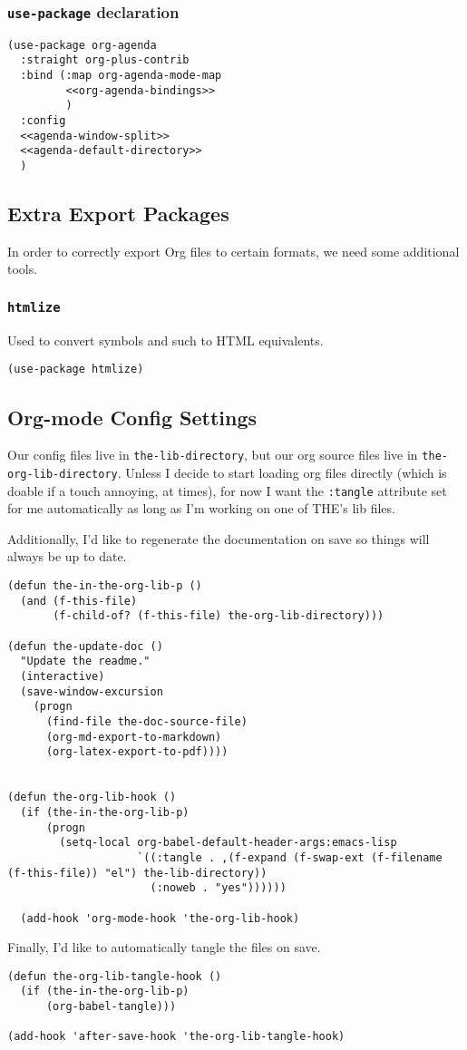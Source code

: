 \documentclass[11pt]{article}
\begin{document}
\subsubsection{\texttt{use-package} declaration}
\label{sec:org788b1d5}
\begin{verbatim}
(use-package org-agenda
  :straight org-plus-contrib
  :bind (:map org-agenda-mode-map
         <<org-agenda-bindings>>
         )
  :config
  <<agenda-window-split>>
  <<agenda-default-directory>>
  )
\end{verbatim}

\subsection{Extra Export Packages}
\label{sec:org6cfff20}
In order to correctly export Org files to certain formats, we need
some additional tools.
\subsubsection{\texttt{htmlize}}
\label{sec:orga1bc077}
Used to convert symbols and such to HTML equivalents.
\begin{verbatim}
(use-package htmlize)
\end{verbatim}
\subsection{Org-mode Config Settings}
\label{sec:org5c41c3e}
Our config files live in \texttt{the-lib-directory}, but our org source files
live in \texttt{the-org-lib-directory}. Unless I decide to start loading org
files directly (which is doable if a touch annoying, at times), for
now I want the \texttt{:tangle} attribute set for me automatically as long as
I'm working on one of THE's lib files.

Additionally, I'd like to regenerate the documentation on save so
things will always be up to date.

\begin{verbatim}
(defun the-in-the-org-lib-p ()
  (and (f-this-file)
       (f-child-of? (f-this-file) the-org-lib-directory)))

(defun the-update-doc ()
  "Update the readme."
  (interactive)
  (save-window-excursion
    (progn
      (find-file the-doc-source-file)
      (org-md-export-to-markdown)
      (org-latex-export-to-pdf))))


(defun the-org-lib-hook ()
  (if (the-in-the-org-lib-p)
      (progn
        (setq-local org-babel-default-header-args:emacs-lisp
                    `((:tangle . ,(f-expand (f-swap-ext (f-filename (f-this-file)) "el") the-lib-directory))
                      (:noweb . "yes"))))))

  (add-hook 'org-mode-hook 'the-org-lib-hook)
\end{verbatim}

Finally, I'd like to automatically tangle the files on save.

\begin{verbatim}
(defun the-org-lib-tangle-hook ()
  (if (the-in-the-org-lib-p)
      (org-babel-tangle)))

(add-hook 'after-save-hook 'the-org-lib-tangle-hook)
\end{verbatim}
\end{document}
